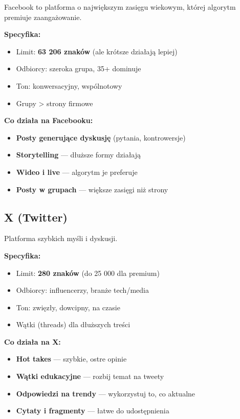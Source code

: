 \documentclass[
  12pt,
  a4paper,
  twoside,
  openright,
  12pt,
  DIV=12,
  BCOR=12mm]{scrbook}
\providecommand{\tightlist}{%
  \setlength{\itemsep}{0pt}\setlength{\parskip}{0pt}}\usepackage{longtable,booktabs,array}
\begin{document}
Facebook to platforma o największym zasięgu wiekowym, której algorytm
premiuje zaangażowanie.

\textbf{Specyfika:}

\begin{itemize}
\tightlist
\item
  Limit: \textbf{63 206 znaków} (ale krótsze działają lepiej)
\item
  Odbiorcy: szeroka grupa, 35+ dominuje
\item
  Ton: konwersacyjny, wspólnotowy
\item
  Grupy \textgreater{} strony firmowe
\end{itemize}

\textbf{Co działa na Facebooku:}

\begin{itemize}
\tightlist
\item
  \textbf{Posty generujące dyskusję} (pytania, kontrowersje)
\item
  \textbf{Storytelling} --- dłuższe formy działają
\item
  \textbf{Wideo i live} --- algorytm je preferuje
\item
  \textbf{Posty w grupach} --- większe zasięgi niż strony
\end{itemize}

\subsection{X (Twitter)}\label{x-twitter}

Platforma szybkich myśli i dyskusji.

\textbf{Specyfika:}

\begin{itemize}
\tightlist
\item
  Limit: \textbf{280 znaków} (do 25 000 dla premium)
\item
  Odbiorcy: influencerzy, branże tech/media
\item
  Ton: zwięzły, dowcipny, na czasie
\item
  Wątki (threads) dla dłuższych treści
\end{itemize}

\textbf{Co działa na X:}

\begin{itemize}
\tightlist
\item
  \textbf{Hot takes} --- szybkie, ostre opinie
\item
  \textbf{Wątki edukacyjne} --- rozbij temat na tweety
\item
  \textbf{Odpowiedzi na trendy} --- wykorzystuj to, co aktualne
\item
  \textbf{Cytaty i fragmenty} --- łatwe do udostępnienia
\end{itemize}
\end{document}
